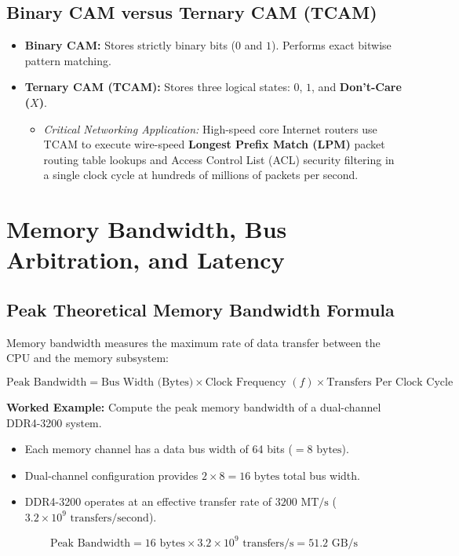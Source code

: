 \subsection{Binary CAM versus Ternary CAM (TCAM)}
\begin{itemize}
    \item \textbf{Binary CAM:} Stores strictly binary bits ($0$ and $1$). Performs exact bitwise pattern matching.
    \item \textbf{Ternary CAM (TCAM):} Stores three logical states: $0$, $1$, and \textbf{Don't-Care ($X$)}.
    \begin{itemize}
        \item \textit{Critical Networking Application:} High-speed core Internet routers use TCAM to execute wire-speed \textbf{Longest Prefix Match (LPM)} packet routing table lookups and Access Control List (ACL) security filtering in a single clock cycle at hundreds of millions of packets per second.
    \end{itemize}
\end{itemize}


\section{Memory Bandwidth, Bus Arbitration, and Latency}
\label{sec:memory_bandwidth}

\subsection{Peak Theoretical Memory Bandwidth Formula}
Memory bandwidth measures the maximum rate of data transfer between the CPU and the memory subsystem:

\begin{equation}
\label{eq:memory_bandwidth}
\boxed{\text{Peak Bandwidth} = \text{Bus Width (Bytes)} \times \text{Clock Frequency } (f) \times \text{Transfers Per Clock Cycle}}
\end{equation}

\textbf{Worked Example:} Compute the peak memory bandwidth of a dual-channel DDR4-3200 system.
\begin{itemize}
    \item Each memory channel has a data bus width of 64 bits ($= 8\text{ bytes}$).
    \item Dual-channel configuration provides $2 \times 8 = 16\text{ bytes}$ total bus width.
    \item DDR4-3200 operates at an effective transfer rate of $3200\text{ MT/s}$ ($3.2 \times 10^9\text{ transfers/second}$).
\end{itemize}
\[ \text{Peak Bandwidth} = 16\text{ bytes} \times 3.2 \times 10^9\text{ transfers/s} = 51.2\text{ GB/s} \]

